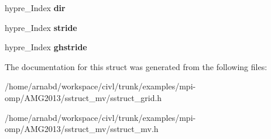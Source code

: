 \begin{DoxyCompactItemize}
\item 
\hypertarget{structhypre__SStructNMapInfo_a47a618f1e02336a9bedaa0bd3af8008c}{}hypre\+\_\+\+Index {\bfseries dir}\label{structhypre__SStructNMapInfo_a47a618f1e02336a9bedaa0bd3af8008c}

\item 
\hypertarget{structhypre__SStructNMapInfo_a60cfd93b3ea40cb8d09776ad94988674}{}hypre\+\_\+\+Index {\bfseries stride}\label{structhypre__SStructNMapInfo_a60cfd93b3ea40cb8d09776ad94988674}

\item 
\hypertarget{structhypre__SStructNMapInfo_a192bf31d27497c3f5763f9d8b590fbcb}{}hypre\+\_\+\+Index {\bfseries ghstride}\label{structhypre__SStructNMapInfo_a192bf31d27497c3f5763f9d8b590fbcb}

\end{DoxyCompactItemize}


The documentation for this struct was generated from the following files\+:\begin{DoxyCompactItemize}
\item 
/home/arnabd/workspace/civl/trunk/examples/mpi-\/omp/\+A\+M\+G2013/sstruct\+\_\+mv/sstruct\+\_\+grid.\+h\item 
/home/arnabd/workspace/civl/trunk/examples/mpi-\/omp/\+A\+M\+G2013/sstruct\+\_\+mv/sstruct\+\_\+mv.\+h\end{DoxyCompactItemize}
